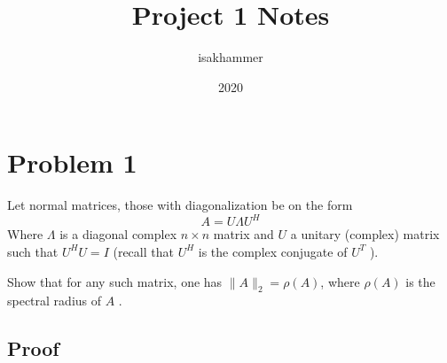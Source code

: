 \documentclass{article}
\title{Project 1 Notes}
\author{isakhammer }
\date{2020}
\theoremstyle{remark}
\newcommand{\newpara}
  {
  \vskip 0.4cm
  }
\begin{document}
\maketitle
\tableofcontents
\newpage

\newpage
\section{Problem 1}%
\label{sec:problem_1}

Let normal matrices, those with diagonalization be on the form \[
A = U \Lambda U^{H} 
\] 
Where $\Lambda $ is a diagonal complex $n\times n $ matrix and $U$ a unitary (complex) matrix such that $U ^{H} U = I$ (recall that $U^{H}$ is the complex conjugate of $U^{T}$ ).
\newpara
Show that for any such matrix, one has $\|A\|_{2} = \rho \left( A \right)$, where $\rho \left( A \right) $ is the spectral radius of $A$ .

\subsection{Proof}%
\label{sub:proof}
\end{document}
